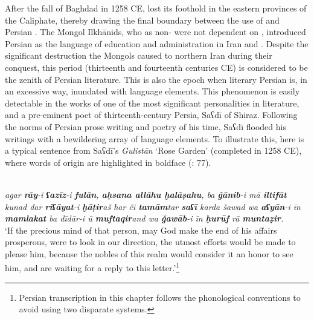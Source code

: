 \documentclass[output=paper]{langsci/langscibook}
\begin{document}
After the fall of Baghdad in 1258 CE,  lost its foothold in the eastern provinces of the Caliphate, thereby drawing the final boundary between the use of  and Persian \citep{Danner2000}. The Mongol Ilkhānids, who as non- were not dependent on , introduced Persian as the language of education and administration in Iran and . Despite the significant destruction the Mongols caused to northern Iran during their conquest, this period (thirteenth and fourteenth centuries CE) is considered to be the zenith of Persian literature. This is also the epoch when literary Persian is, in an excessive way, inundated with  language elements. This phenomenon is easily detectable in the works of one of the most significant personalities in  literature, and a pre-eminent poet of thirteenth-century Persia, Saʕdī of Shiraz. Following the norms of Persian prose writing and poetry of his time, Saʕdī flooded his writings with a bewildering array of  language elements. To illustrate this, here is a typical sentence from Saʕdī’s \textit{Gulistān} ‘Rose Garden’ (completed in 1258 CE), where words of  origin are highlighted in boldface (\citealt{Yūsifī2004}: 77).


\ea
{}\\
{\itshape agar \textbf{rāy}-i \textbf{ʕazīz}-i \textbf{fulān}, \textbf{aḥsana allāhu ḫalāṣahu}, ba \textbf{ǧānib}-i mā \textbf{iltifāt} kunad dar \textbf{riʕāyat}-i \textbf{ḫāṭir}aš har či \textbf{tamām}tar \textbf{saʕī}  karda  šawad wa \textbf{aʕyān}-i īn \textbf{mamlakat} ba dīdār-i ū \textbf{muftaqir}and wa \textbf{ǧawāb}-i īn \textbf{ḥurūf} rā \textbf{muntaẓir}.}\\
\glt ‘If the precious mind of that person, may God make the end of his affairs prosperous, were to look in our direction, the utmost efforts would be made to please him, because the nobles of this realm would consider it an honor to see him, and are waiting for a reply to this letter.’\footnote{Persian transcription in this chapter follows the  phonological conventions to avoid using two disparate systems.}
\z
\end{document}
